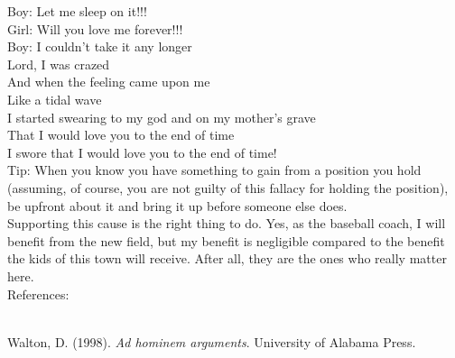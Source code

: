 \documentclass[a4paper,12pt,single,pdftex]{scrbook}
\begin{document}
    
      Boy: Let me sleep on it!!!
    \\

    
      Girl: Will you love me forever!!!
    \\

    
      Boy: I couldn't take it any longer
    \\

    
      Lord, I was crazed
    \\

    
      And when the feeling came upon me
    \\

    
      Like a tidal wave
    \\

    
      I started swearing to my god and on my mother's grave
    \\

    
      That I would love you to the end of time
    \\

    
      I swore that I would love you to the end of time!
    \\

    
      Tip: When you know you have something to gain from a position you hold (assuming, of course, you are not guilty of this fallacy for holding the position), be upfront about it and bring it up before someone else does.
    \\

    
      Supporting this cause is the right thing to do.  Yes, as the baseball coach, I will benefit from the new field, but my benefit is negligible compared to the benefit the kids of this town will receive.  After all, they are the ones who really matter here.
    \\

    References:

    
      
        
      \\

      
        
          Walton, D. (1998). {\it Ad hominem arguments}. University of Alabama Press.
        
      
    
\end{document}
